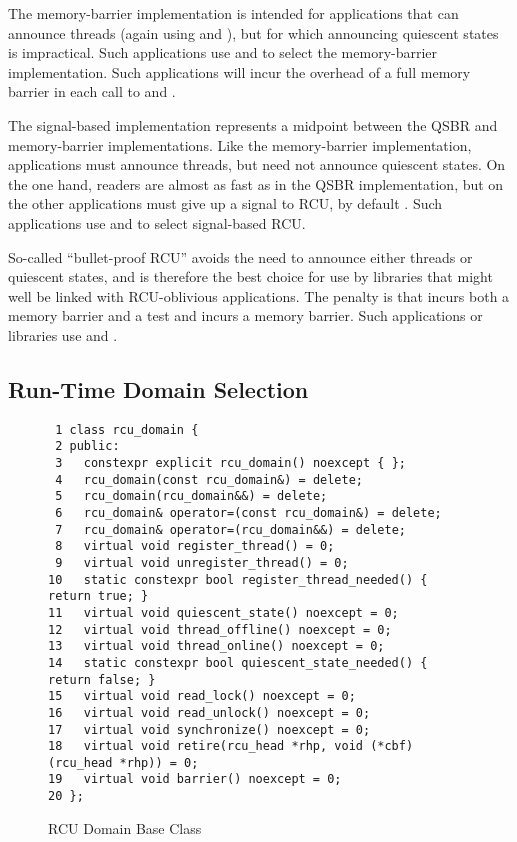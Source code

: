 \documentclass[letterpaper,10pt]{article}
\begin{document}
The memory-barrier implementation is intended for applications that
can announce threads (again using  and
), but for which announcing quiescent states is
impractical.
Such applications use  and
 to select the memory-barrier implementation.
Such applications will incur the overhead of a full memory barrier in
each call to  and .

The signal-based implementation represents a midpoint between the QSBR
and memory-barrier implementations.
Like the memory-barrier implementation, applications must announce
threads, but need not announce quiescent states.
On the one hand, readers are almost as fast as in the QSBR implementation,
but on the other applications must give up a signal to RCU, by default
.
Such applications use  and
 to select signal-based RCU.

So-called ``bullet-proof RCU'' avoids the need to announce either threads
or quiescent states, and is therefore the best choice for use by
libraries that might well be linked with RCU-oblivious applications.
The penalty is that  incurs both a memory barrier
and a test and  incurs a memory barrier.
Such applications or libraries use  and
.

\subsection{Run-Time Domain Selection}
\label{sec:Run-Time Domain Selection}

\begin{figure}[tbp]
{ \scriptsize
\begin{verbatim}
 1 class rcu_domain {
 2 public:
 3   constexpr explicit rcu_domain() noexcept { };
 4   rcu_domain(const rcu_domain&) = delete;
 5   rcu_domain(rcu_domain&&) = delete;
 6   rcu_domain& operator=(const rcu_domain&) = delete;
 7   rcu_domain& operator=(rcu_domain&&) = delete;
 8   virtual void register_thread() = 0;
 9   virtual void unregister_thread() = 0;
10   static constexpr bool register_thread_needed() { return true; }
11   virtual void quiescent_state() noexcept = 0;
12   virtual void thread_offline() noexcept = 0;
13   virtual void thread_online() noexcept = 0;
14   static constexpr bool quiescent_state_needed() { return false; }
15   virtual void read_lock() noexcept = 0;
16   virtual void read_unlock() noexcept = 0;
17   virtual void synchronize() noexcept = 0;
18   virtual void retire(rcu_head *rhp, void (*cbf)(rcu_head *rhp)) = 0;
19   virtual void barrier() noexcept = 0;
20 };
\end{verbatim}
}
\caption{RCU Domain Base Class}
\label{fig:RCU Domain Base Class}
\end{figure}
\end{document}
